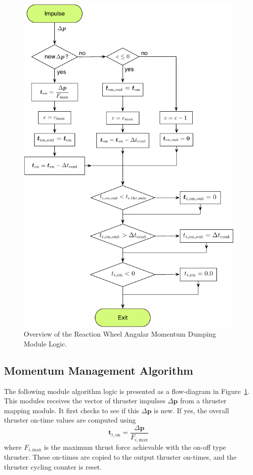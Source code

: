 \documentclass[]{BasiliskReportMemo}
\begin{document}
\begin{figure}[!t]
	\centerline{
	\includegraphics[]{Figures/rwMomentumDumping}
	}
	\caption{Overview of the Reaction Wheel Angular Momentum Dumping Module Logic.}
	\label{fig:Fig2}
\end{figure}


\subsection{Momentum Management Algorithm}
The following module algorithm logic is presented as a flow-diagram in Figure~\ref{fig:Fig2}.  This modules receives the vector of thruster impulses $\Delta\bm p$ from a thruster mapping module.  It first checks to see if this $\Delta\bm p$ is new.  If yes,  the overall thruster on-time values are computed using
\begin{equation}
	\bm t_{i,\text{on}} = \frac{\Delta \bm p}{F_{i,\text{max}}}
\end{equation}
where $F_{i,\text{max}}$ is the maximum thrust force achievable with the on-off type thruster.  These on-times are copied to the output thruster on-times, and the thruster cycling counter is reset.  
\end{document}
